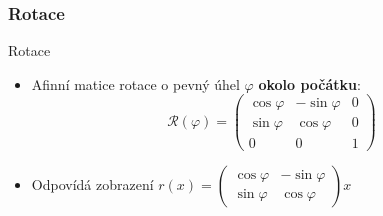 \subsubsection{Rotace}
\begin{frame}[t]{Rotace}
    \begin{itemize}
        \item Afinní matice rotace o pevný úhel $\varphi$ \textbf{okolo počátku}:
        \[\mathcal{R}(\varphi)=\left(\begin{matrix}
            \cos\varphi & -\sin\varphi & 0\\
            \sin\varphi & \cos\varphi & 0\\
            0 & 0 & 1
        \end{matrix}\right)\]
        \item Odpovídá zobrazení $r(x)=\left(\begin{matrix}
            \cos\varphi & -\sin\varphi\\
            \sin\varphi & \cos\varphi
        \end{matrix}\right)x$
    \end{itemize}
\end{frame}

